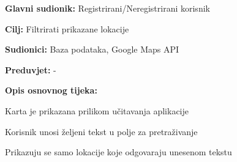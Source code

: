 					\noindent {}
					\begin{packed_item}
	
						\item \textbf{Glavni sudionik: }Registrirani/Neregistrirani korisnik
						\item  \textbf{Cilj:} Filtrirati prikazane lokacije
						\item  \textbf{Sudionici:} Baza podataka, Google Maps API
						\item  \textbf{Preduvjet:} -
						\item  \textbf{Opis osnovnog tijeka:}
						
						\item[] \begin{packed_enum}
	
							\item Karta je prikazana prilikom učitavanja aplikacije
							\item Korisnik unosi željeni tekst u polje za pretraživanje
							\item Prikazuju se samo lokacije koje odgovaraju unesenom tekstu

						\end{packed_enum}
						
					\end{packed_item}
					
